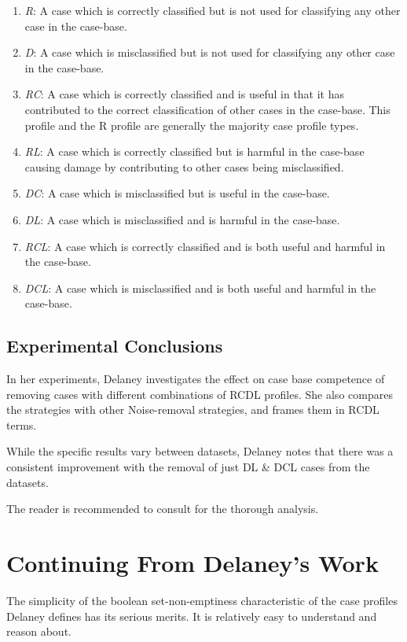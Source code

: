 \documentclass[a4paper,11pt]{report}
\begin{document}
\begin{enumerate}
	\item \emph{R}: A case which is correctly classified but is not used for classifying any other case in the case-base.
	\item \emph{D}: A case which is misclassified but is not used for classifying any other case in the case-base.
	\item \emph{RC}: A case which is correctly classified and is useful in that it has contributed to the correct classification of other cases in the case-base. This profile and the R profile are generally the majority case profile types.
	\item \emph{RL}: A case which is correctly classified but is harmful in the case-base causing damage by contributing to other cases being misclassified.
	\item \emph{DC}: A case which is misclassified but is useful in the case-base. 
	\item \emph{DL}: A case which is misclassified and is harmful in the case-base.
	\item \emph{RCL}: A case which is correctly classified and is both useful and harmful in the case-base.
	\item \emph{DCL}: A case which is misclassified and is both useful and harmful in the case-base.
\end{enumerate}


\subsection{Experimental Conclusions}
In her experiments, Delaney investigates the effect on case base competence of removing cases with different combinations of RCDL profiles. She also compares the strategies with other Noise-removal strategies, and frames them in RCDL terms.

While the specific results vary between datasets, Delaney notes that there was a consistent improvement with the removal of just DL \& DCL cases from the datasets. 

The reader is recommended to consult \citet{Delany2009} for the thorough analysis.

\section{Continuing From Delaney's Work}
The simplicity of the boolean set-non-emptiness characteristic of the case profiles Delaney defines has its serious merits. It is relatively easy to understand and reason about. 
\end{document}
